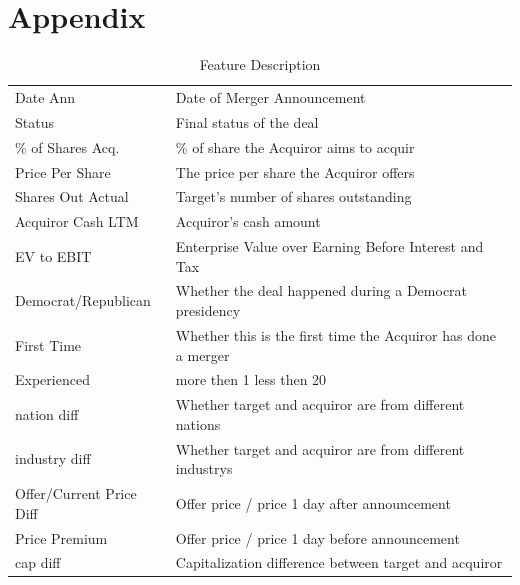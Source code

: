 \documentclass[a4paper]{article}
\begin{document}
\newpage 
\section{Appendix }
\label{sec:tables}

\begin{table}[h]
\caption{Feature Description}
\begin{tabular}{ll}
Date Ann                 & Date of Merger Announcement                                  \\
Status                   & Final status of the deal                                     \\
\% of Shares Acq.        & \% of share the Acquiror aims to acquir                      \\
Price Per Share          & The price per share the Acquiror offers                      \\
Shares Out Actual        & Target's number of shares outstanding                        \\
Acquiror Cash LTM        & Acquiror's cash amount                                       \\
EV to EBIT               & Enterprise Value over Earning Before Interest and Tax        \\
Democrat/Republican      & Whether the deal happened during a Democrat presidency       \\
First Time               & Whether this is the first time the Acquiror has done a merger \\
Experienced              & more then 1 less then 20                            \\
nation diff              & Whether target and acquiror are from different nations       \\
industry diff            & Whether target and acquiror are from different industrys     \\
Offer/Current Price Diff & Offer price / price 1 day after announcement                 \\
Price Premium            & Offer price / price 1 day before announcement                \\
cap diff                & Capitalization difference between target and acquiror       
\end{tabular}
\end{table}
\end{document}
